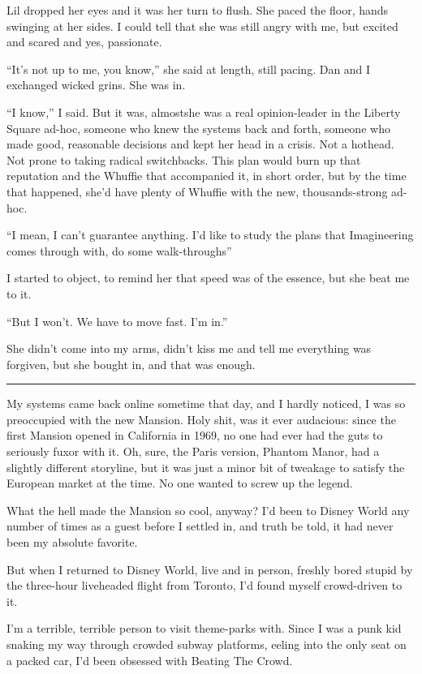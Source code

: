 Lil dropped her eyes and it was her turn to flush. She paced the
floor, hands swinging at her sides. I could tell that she was still
angry with me, but excited and scared and yes, passionate.

“It's not up to me, you know,” she said at length, still pacing.
Dan and I exchanged wicked grins. She was in.

“I know,” I said. But it was, almost{\dash}she was a real opin\-ion-leader
in the Liberty Square ad-hoc, someone who knew the systems back and
forth, someone who made good, reasonable decisions and kept her
head in a crisis. Not a hothead. Not prone to taking radical
switchbacks. This plan would burn up that reputation and the
Whuffie that accompanied it, in short order, but by the time that
happened, she'd have plenty of Whuffie with the new,
thousands-strong ad-hoc.

“I mean, I can't guarantee anything. I'd like to study the plans
that Imagineering comes through with, do some walk-throughs{\dash}”

I started to object, to remind her that speed was of the essence,
but she beat me to it.

“But I won't. We have to move fast. I'm in.”

She didn't come into my arms, didn't kiss me and tell me everything
was forgiven, but she bought in, and that was enough.

\begin{center}\rule{1in}{0.4pt}\end{center}

My systems came back online sometime that day, and I hardly
noticed, I was so preoccupied with the new Mansion. Holy shit, was
it ever audacious: since the first Mansion opened in California in
1969, no one had ever had the guts to seriously fuxor with it. Oh,
sure, the Paris version, Phantom Manor, had a slightly different
storyline, but it was just a minor bit of tweakage to satisfy the
European market at the time. No one wanted to screw up the legend.

What the hell made the Mansion so cool, anyway? I'd been to Disney
World any number of times as a guest before I settled in, and truth
be told, it had never been my absolute favorite.

But when I returned to Disney World, live and in person, freshly
bored stupid by the three-hour liveheaded flight from Toronto, I'd
found myself crowd-driven to it.

I'm a terrible, terrible person to visit theme-parks with. Since I
was a punk kid snaking my way through crowded subway platforms,
eeling into the only seat on a packed car, I'd been obsessed with
Beating The Crowd.

